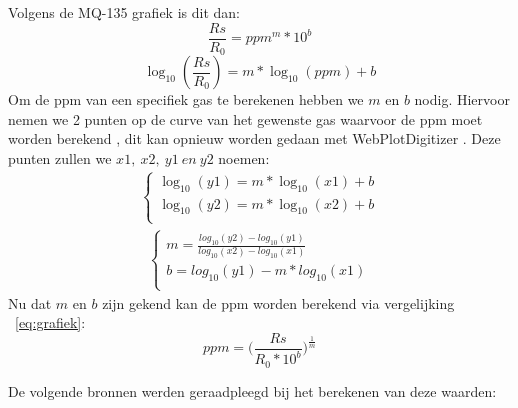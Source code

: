Volgens de MQ-135 grafiek is dit dan:
\begin{equation}
    \label{eq:grafiek}
    \frac{Rs}{R_0} = ppm^{m} * 10^{b}
\end{equation}
\begin{equation}
    \log_{10} (\frac{Rs}{R_0}) = m * \log_{10} (ppm) + b
\end{equation}
Om de ppm van een specifiek gas te berekenen hebben we $m$ en $b$ nodig. Hiervoor nemen we 2 punten op de curve van het gewenste gas waarvoor de ppm moet worden berekend
, dit kan opnieuw worden gedaan met WebPlotDigitizer
. Deze punten zullen we $x1,\ x2,\ y1\ en\ y2$ noemen:
\begin{eqnarray}
    \begin{cases}
        \log_{10} (y1) = m * \log_{10} (x1) + b\\
        \log_{10} (y2) = m * \log_{10} (x2) + b\\
    \end{cases}
\end{eqnarray}
\begin{eqnarray}
    \begin{cases}
        m = \frac{log_{10} (y2) - log_{10} (y1)}{log_{10} (x2) - log_{10} (x1)} \\
        b = log_{10} (y1) - m * log_{10} (x1)\\
    \end{cases}
\end{eqnarray}
Nu dat $m$ en $b$ zijn gekend kan de ppm worden berekend via vergelijking ~\ref{eq:grafiek}:
\begin{equation}
    ppm = \Big(\frac{Rs}{R_0 * 10^{b}}\Big)^{\frac{1}{m}}
\end{equation}

De volgende bronnen werden geraadpleegd bij het berekenen van deze waarden:



